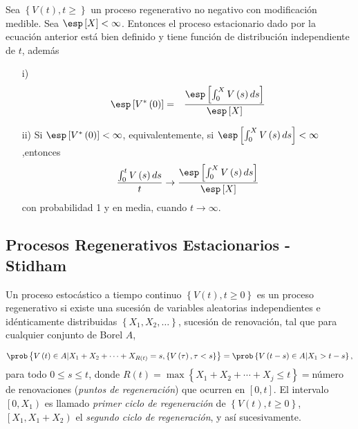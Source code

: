 \begin{Teo}
Sea $\left\{V\left(t\right),t\geq\right\}$ un proceso regenerativo no negativo con modificaci\'on medible. Sea $\esp\left[X\right]<\infty$. Entonces el proceso estacionario dado por la ecuaci\'on anterior est\'a bien definido y tiene funci\'on de distribuci\'on independiente de $t$, adem\'as
\begin{itemize}
\item[i)] \begin{eqnarray*}
\esp\left[V^{*}\left(0\right)\right]&=&\frac{\esp\left[\int_{0}^{X}V\left(s\right)ds\right]}{\esp\left[X\right]}\end{eqnarray*}
\item[ii)] Si $\esp\left[V^{*}\left(0\right)\right]<\infty$, equivalentemente, si $\esp\left[\int_{0}^{X}V\left(s\right)ds\right]<\infty$,entonces
\begin{eqnarray*}
\frac{\int_{0}^{t}V\left(s\right)ds}{t}\rightarrow\frac{\esp\left[\int_{0}^{X}V\left(s\right)ds\right]}{\esp\left[X\right]}
\end{eqnarray*}
con probabilidad 1 y en media, cuando $t\rightarrow\infty$.
\end{itemize}
\end{Teo}


\subsection{Procesos Regenerativos Estacionarios - Stidham \cite{Stidham}}


Un proceso estoc\'astico a tiempo continuo $\left\{V\left(t\right),t\geq0\right\}$ es un proceso regenerativo si existe una sucesi\'on de variables aleatorias independientes e id\'enticamente distribuidas $\left\{X_{1},X_{2},\ldots\right\}$, sucesi\'on de renovaci\'on, tal que para cualquier conjunto de Borel $A$, 

\begin{eqnarray*}
\prob\left\{V\left(t\right)\in A|X_{1}+X_{2}+\cdots+X_{R\left(t\right)}=s,\left\{V\left(\tau\right),\tau<s\right\}\right\}=\prob\left\{V\left(t-s\right)\in A|X_{1}>t-s\right\},
\end{eqnarray*}
para todo $0\leq s\leq t$, donde $R\left(t\right)=\max\left\{X_{1}+X_{2}+\cdots+X_{j}\leq t\right\}=$n\'umero de renovaciones ({\emph{puntos de regeneraci\'on}}) que ocurren en $\left[0,t\right]$. El intervalo $\left[0,X_{1}\right)$ es llamado {\emph{primer ciclo de regeneraci\'on}} de $\left\{V\left(t \right),t\geq0\right\}$, $\left[X_{1},X_{1}+X_{2}\right)$ el {\emph{segundo ciclo de regeneraci\'on}}, y as\'i sucesivamente.

